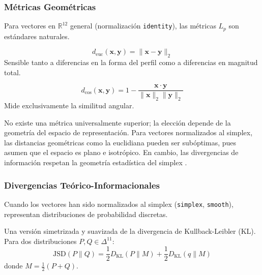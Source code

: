 \subsubsection{Métricas Geométricas}

Para vectores en $\mathbb{R}^{12}$ general (normalización \texttt{identity}), las métricas $L_p$ son estándares naturales.

\begin{definition}
\begin{equation}
d_{\text{euc}}(\mathbf{x}, \mathbf{y}) = \|\mathbf{x} - \mathbf{y}\|_2
\end{equation}
Sensible tanto a diferencias en la forma del perfil como a diferencias en magnitud total.
\end{definition}

\begin{definition}
\begin{equation}
d_{\cos}(\mathbf{x}, \mathbf{y}) = 1 - \frac{\mathbf{x} \cdot \mathbf{y}}{\|\mathbf{x}\|_2 \|\mathbf{y}\|_2}
\end{equation}
Mide exclusivamente la similitud angular.
\end{definition}

No existe una métrica universalmente superior; la elección depende de la geometría del espacio de representación. Para vectores normalizados al simplex, las distancias geométricas como la euclidiana pueden ser subóptimas, pues asumen que el espacio es plano e isotrópico. En cambio, las divergencias de información respetan la geometría estadística del simplex \cite{Amari2016}.

\subsubsection{Divergencias Teórico-Informacionales}

Cuando los vectores han sido normalizados al simplex (\texttt{simplex}, \texttt{smooth}), representan distribuciones de probabilidad discretas.

\begin{definition}
Una versión simetrizada y suavizada de la divergencia de Kullback-Leibler (KL). Para dos distribuciones $P, Q \in \Delta^{11}$:
\begin{equation}
\text{JSD}(P \| Q) = \frac{1}{2} D_{\text{KL}}(P \| M) + \frac{1}{2} D_{\text{KL}}(q \| M)
\end{equation}
donde $M = \frac{1}{2}(P+Q)$.
\end{definition}

